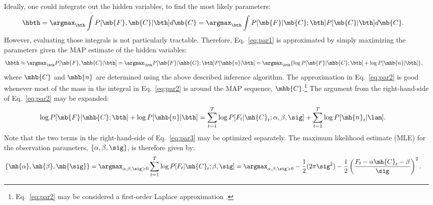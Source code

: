 Ideally, one could integrate out the hidden variables, to find the most likely parameters:
\begin{align} \label{eq:par1}
\hbth &= \argmax_{\bth} \int P[\mb{F}, \mb{C} | \bth] d\mb{C}  = \argmax_{\bth} \int P[\mb{F} | \mb{C}; \bth] P[\mb{C} | \bth] d\mb{C}.
\end{align}
However, evaluating those integrals is not particularly tractable.
Therefore, Eq.~\eqref{eq:par1} is approximated by simply maximizing the parameters given the MAP estimate of the hidden variables:
\begin{align} \label{eq:par2}
\hbth &\approx \argmax_{\bth} P[\mb{F}, \mhb{C} | \bth] = \argmax_{\bth} P[\mb{F}| \mhb{C}; \bth] P[\mhb{n} | \bth] = \argmax_{\bth} \{ \log P[\mb{F} | \mhb{C}; \bth] + \log P[\mhb{n} | \bth] \}, 
\end{align}
\noindent where $\mhb{C}$ and $\mhb{n}$ are determined using the above described inference algorithm. The approximation in Eq.~\eqref{eq:par2} is good whenever most of the mass in the integral in Eq.~\eqref{eq:par2} is around the MAP sequence, $\mhb{C}$.\footnote{Eq.~\eqref{eq:par2} may be considered a first-order Laplace approximation \cite{KassRaftery95}.}  The argument from the right-hand-side of Eq.~\eqref{eq:par2} may be expanded: 
\begin{align} \label{eq:par3}
\log P[\mb{F}| \mhb{C}; \bth] + \log P[\mhb{n} | \bth] &= \sum_{t=1}^T \log P[F_t | \mh{C}_t; \alpha, \beta,\sig] + \sum_{t=1}^T \log P[\mh{n}_t | \lam].
\end{align}
\noindent Note that the two terms in the right-hand-side of Eq.~\eqref{eq:par3} may be optimized separately.  The maximum likelihood estimate (MLE) for the observation parameters, $\{\alpha,\beta,\sig\}$, is therefore given by:
\begin{align} \label{eq:beta,sig}
	\{\mh{\alpha}, \mh{\beta},\mh{\sig}\} &=  \argmax_{\alpha, \beta,\sig >0} \sum_{t=1}^T \log P[F_t | \mh{C}_t; \beta,\sig]
	=  \argmax_{\alpha, \beta,\sig >0} 	-\frac{1}{2} (2\pi \sig^2) - \frac{1}{2} \left(\frac{F_t-\alpha \mh{C}_t -\beta}{\sig}\right)^2. %
\end{align}

